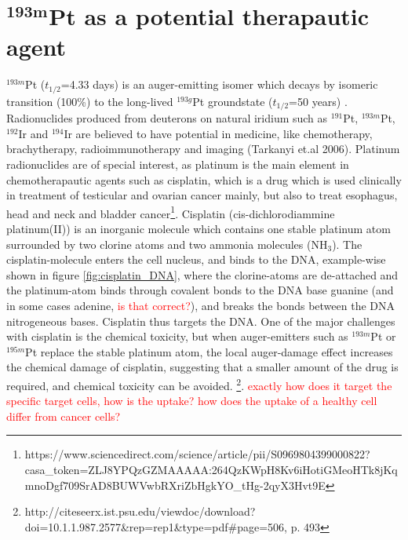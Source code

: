 






\section{$\mathbf{^{193m}}$Pt as a potential therapautic agent}
$^{193m}$Pt ($t_{1/2}$=4.33 days) is an auger-emitting isomer which decays by isomeric transition (100\%) to the long-lived $^{193g}$Pt groundstate ($t_{1/2}$=50 years) \cite{ShamsuzzohaBasunia2017a}. Radionuclides produced from deuterons on natural iridium such as $^{191}$Pt, $^{193m}$Pt, $^{192}$Ir and $^{194}$Ir are believed to have potential in medicine, like chemotherapy, brachytherapy, radioimmunotherapy and imaging (Tarkanyi et.al 2006). Platinum radionuclides are of special interest, as platinum is the main element in chemotherapautic agents such as cisplatin, which is a drug which is used clinically in treatment of testicular and ovarian cancer mainly, but also to treat esophagus, head and neck and bladder cancer\footnote{https://www.sciencedirect.com/science/article/pii/S0969804399000822?casa_token=ZLJ8YPQzGZMAAAAA:264QzKWpH8Kv6iHotiGMeoHTk8jKqmnoDgf709SrAD8BUWVwbRXriZbHgkYO_tHg-2qyX3Hvt9E}. Cisplatin  (cis-dichlorodiammine platinum(II)) is an inorganic molecule which contains one stable platinum atom surrounded by two clorine atoms and two ammonia molecules (NH$_3$). The cisplatin-molecule enters the cell nucleus, and binds to the DNA, example-wise shown in figure \ref{fig:cisplatin_DNA}, where the clorine-atoms are de-attached and the platinum-atom binds through covalent bonds to the DNA base guanine (and in some cases adenine, \textcolor{red}{is that correct?}), and breaks the bonds between the DNA nitrogeneous bases. Cisplatin thus targets the DNA. One of the major challenges with cisplatin is the chemical toxicity, but when auger-emitters such as $^{193m}$Pt or $^{195m}$Pt replace the stable platinum atom, the local auger-damage effect increases the chemical damage of cisplatin, suggesting that a smaller amount of the drug is required, and chemical toxicity can be avoided. \footnote{http://citeseerx.ist.psu.edu/viewdoc/download?doi=10.1.1.987.2577&rep=rep1&type=pdf#page=506, p. 493}.  \textcolor{red}{exactly how does it target the specific target cells, how is the uptake? how does the uptake of a healthy cell differ from cancer cells?}

